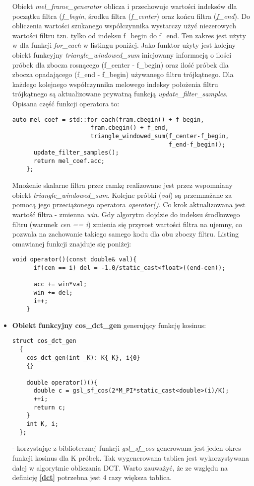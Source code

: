 \begin{itemize}
Obiekt \textit{mel\_frame\_generator} oblicza i przechowuje wartości indeksów dla początku filtra (\textit{f\_begin}, środku filtra (\textit{f\_center}) oraz końcu filtra (\textit{f\_end}). Do obliczenia wartości szukanego współczynnika wystarczy użyć niezerowych wartości filtru tzn. tylko od indeksu f\_begin do f\_end. Ten zakres jest użyty w dla funkcji \textit{for\_each} w listingu poniżej. Jako funktor użyty jest kolejny obiekt funkcyjny \textit{triangle\_windowed\_sum} inicjowany informacją o ilości próbek dla zbocza rosnącego (f\_center - f\_begin) oraz ilość próbek dla zbocza opadającego (f\_end - f\_begin) używanego filtru trójkątnego. Dla każdego kolejnego współczynnika melowego indeksy położenia filtru trójkątnego są aktualizowane prywatną funkcją \textit{update\_filter\_samples}. Opisana część funkcji operatora to: 
 \begin{lstlisting}[style=lst:cpp]
      auto mel_coef = std::for_each(fram.cbegin() + f_begin,
                      fram.cbegin() + f_end,
                      triangle_windowed_sum(f_center-f_begin,
                                            f_end-f_begin));
      update_filter_samples();
      return mel_coef.acc;
    };
 \end{lstlisting}

 Mnożenie skalarne filtra przez ramkę realizowane jest przez wspomniany obiekt \textit{triangle\_windowed\_sum}. Kolejne próbki (\textit{val}) są przemnażane za pomocą jego przeciążonego operatora \textit{operator()}. Co krok aktualizowana jest wartość filtra - zmienna \textit{win}. Gdy algorytm dojdzie do indeksu środkowego filtru (warunek \textit{cen == i}) zmienia się przyrost wartości filtra na ujemny, co pozwala na zachowanie takiego samego kodu dla obu zboczy filtru. Listing omawianej funkcji znajduje się poniżej:
 \begin{lstlisting}[style=lst:cpp]
    void operator()(const double& val){
      if(cen == i) del = -1.0/static_cast<float>((end-cen));

      acc += win*val;
      win += del;
      i++;
    }
 \end{lstlisting}

\item{\textbf{Obiekt funkcyjny cos\_dct\_gen} generujący funkcję kosinus:
 \begin{lstlisting}[style=lst:cpp]
  struct cos_dct_gen
  {
    cos_dct_gen(int _K): K{_K}, i{0}
    {}

    double operator()(){
      double c = gsl_sf_cos(2*M_PI*static_cast<double>(i)/K);
      ++i;
      return c;
    }
    int K, i;
  };
\end{lstlisting}
}
- korzystając z bibliotecznej funkcji \textit{gsl\_sf\_cos} generowana jest jeden okres funkcji kosinus dla K próbek. Tak wygenerowana tablica jest wykorzystywana dalej w algorytmie obliczania DCT. Warto zauważyć, że ze względu na definicję \textbf{\ref{dct}} potrzebna jest 4 razy większa tablica.



\end{itemize}
